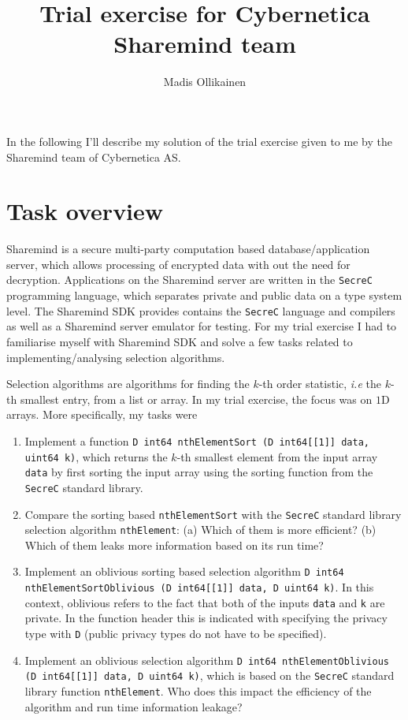 \documentclass[11pt]{article}
\author{Madis Ollikainen}
\title{Trial exercise for Cybernetica Sharemind team}
\newcommand{\ct}[1]{\texttt{#1}}
\newcommand{\SC}{\ct{SecreC}\xspace}
\begin{document}
\maketitle

In the following I'll describe my solution of the trial exercise given to me by the Sharemind team of Cybernetica AS.

\section{Task overview} %
\label{sec:task_overview}

Sharemind is a secure multi-party computation based database/application server, which allows processing of encrypted data with out the need for decryption. Applications on the Sharemind server are written in the \SC programming language, which separates private and public data on a type system level. The Sharemind SDK provides contains the \SC language and compilers as well as a Sharemind server emulator for testing. For my trial exercise I had to familiarise myself with Sharemind SDK and solve a few tasks related to implementing/analysing selection algorithms.

Selection algorithms are algorithms for finding the $k$-th order statistic, \emph{i.e} the $k$-th smallest entry, from a list or array. In my trial exercise, the focus was on $1$D arrays. More specifically, my tasks were

\begin{enumerate}
      	\item Implement a function \ct{D int64 nthElementSort (D int64[[1]] data, uint64 k)}, which returns the $k$-th smallest element from the input array \ct{data} by first sorting the input array using the sorting function from the \SC standard library.

      	\item Compare the sorting based \ct{nthElementSort} with the \SC standard library selection algorithm \ct{nthElement}: (a) Which of them is more efficient? (b) Which of them leaks more information based on its run time? 

      	\item Implement an oblivious sorting based selection algorithm \ct{D int64 nthElementSortOblivious (D int64[[1]] data, D uint64 k)}. In this context, oblivious refers to the fact that both of the inputs \ct{data} and \ct{k} are private. In the function header this is indicated with specifying the privacy type with \ct{D} (public privacy types do not have to be specified). 

      	\item Implement an oblivious selection algorithm \ct{D int64 nthElementOblivious (D int64[[1]] data, D uint64 k)}, which is based on the \SC standard library function \ct{nthElement}. Who does this impact the efficiency of the algorithm and run time information leakage? 
\end{enumerate}      
\end{document}
